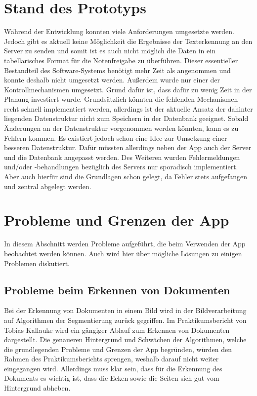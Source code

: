\documentclass[notables, nomenclature, oneside, 150]{HSMW-Thesis}
\begin{document}
	\section{Stand des Prototyps}
		Während der Entwicklung konnten viele Anforderungen umgesetzte werden. Jedoch gibt es aktuell keine Möglichkeit die Ergebnisse der Texterkennung an den Server zu senden und somit ist es auch nicht möglich die Daten in ein tabellarisches Format für die Notenfreigabe zu überführen. Dieser essentieller Bestandteil des Software-Systems benötigt mehr Zeit als angenommen und konnte deshalb nicht umgesetzt werden. Außerdem wurde nur einer der Kontrollmechanismen umgesetzt. Grund dafür ist, dass dafür zu wenig Zeit in der Planung investiert wurde. Grundsätzlich könnten die fehlenden Mechanismen recht schnell implementiert werden, allerdings ist der aktuelle Ansatz der dahinter liegenden Datenstruktur nicht zum Speichern in der Datenbank geeignet. Sobald Änderungen an der Datenstruktur vorgenommen werden könnten, kann es zu Fehlern kommen. Es existiert jedoch schon eine Idee zur Umsetzung einer besseren Datenstruktur. Dafür müssten allerdings neben der App auch der Server und die Datenbank angepasst werden. Des Weiteren wurden Fehlermeldungen und/oder -behandlungen bezüglich des Servers nur sporadisch implementiert. Aber auch hierfür sind die Grundlagen schon gelegt, da Fehler stets aufgefangen und zentral abgelegt werden. 
	
%	
%	
%	
%	
%	
%	
	\section{Probleme und Grenzen der App}\label{sc:grenzen}
		In diesem Abschnitt werden Probleme aufgeführt, die beim Verwenden der App beobachtet werden können. Auch wird hier über mögliche Lösungen zu einigen Problemen diskutiert.

		\subsection{Probleme beim Erkennen von Dokumenten}\label{ssc:erkennen}
			Bei der Erkennung von Dokumenten in einem Bild wird in der Bildverarbeitung auf Algorithmen der Segmentierung zurück gegriffen. Im Praktikumsbericht von Tobias Kallauke wird ein gängiger Ablauf zum Erkennen von Dokumenten dargestellt. Die genaueren Hintergrund und Schwächen der Algorithmen, welche die grundlegenden Probleme und Grenzen der App begründen, würden den Rahmen des Praktikumsberichts sprengen, weshalb darauf nicht weiter eingegangen wird. Allerdings muss klar sein, dass für die Erkennung des Dokuments es wichtig ist, dass die Ecken sowie die Seiten sich gut vom Hintergrund abheben.
		
\end{document}
